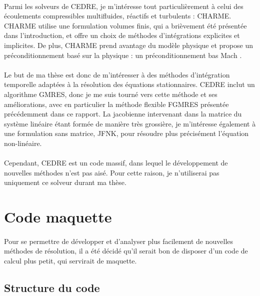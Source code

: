   \paragraph{}
  Parmi les solveurs de CEDRE, je m'intéresse tout particulièrement à celui des écoulements compressibles multifluides, réactifs et turbulents : CHARME.
  CHARME utilise une formulation volumes finis, qui a brièvement été présentée dans l'introduction, et offre un choix de méthodes d'intégrations explicites et implicites.
  De plus, CHARME prend avantage du modèle physique et propose un préconditionnement basé sur la physique : un préconditionnement bas Mach \cite{Turkel1987}.

  \paragraph{}
  Le but de ma thèse est donc de m'intéresser à des méthodes d'intégration temporelle adaptées à la résolution des équations stationnaires.
  CEDRE inclut un algorithme GMRES, donc je me suis tourné vers cette méthode et ses améliorations, avec en particulier la méthode flexible FGMRES présentée précédemment dans ce rapport.
  La jacobienne intervenant dans la matrice du système linéaire étant formée de manière très grossière, je m'intéresse également à une formulation sans matrice, JFNK, pour résoudre plus précisément l'équation non-linéaire.

  \paragraph{}
  Cependant, CEDRE est un code massif, dans lequel le développement de nouvelles méthodes n'est pas aisé.
  Pour cette raison, je n'utiliserai pas uniquement ce solveur durant ma thèse.


\section{Code maquette}

  \paragraph{}
  Pour se permettre de développer et d'analyser plus facilement de nouvelles méthodes de résolution, il a été décidé qu'il serait bon de disposer d'un code de calcul plus petit, qui servirait de maquette.

  \subsection{Structure du code}

